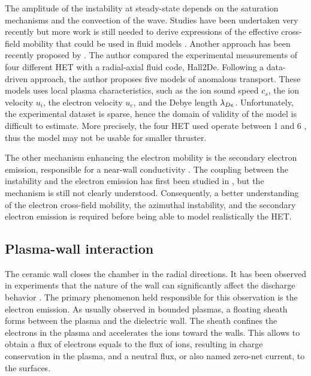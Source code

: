   The amplitude of the instability at steady-state depends on the saturation mechanisms and the convection of the wave.
  Studies have been  undertaken very recently but more work is still needed to derive expressions of the effective cross-field mobility that could be used in fluid models \citep{boeuf2017}.
  Another approach has been recently proposed by \citet{jorns2018}.
  The author compared the experimental measurements of four different \ac{HET} with a radial-axial fluid code, Hall2De.
  Following a data-driven approach, the author proposes five models of anomalous transport.
  These models uses local plasma characteristics, such as the ion sound speed $c_s$, the ion velocity $u_i$, the electron velocity $u_e$, and the Debye length $\lambda_{De}$.
  Unfortunately, the experimental dataset is sparse, hence the domain of validity of the model is difficult to estimate.
  More precisely, the four \ac{HET} used operate between 1 and 6 \kilo\watt, thus the model may not be usable for smaller thruster.
  
  The other mechanism enhancing the electron mobility is the secondary electron emission, responsible for a near-wall conductivity \citep{morozov1972,morozov2001, barral2003a}.
  The coupling between the instability and the electron emission has first been studied in \citet{heron2013}, but the mechanism is still not clearly understood.
  Consequently, a better understanding of the electron cross-field mobility, the azimuthal instability, and the secondary electron emission is required before being able to model realistically the \ac{HET}.
  
  
\subsection{Plasma-wall interaction}

  The ceramic wall closes the chamber in the radial directions.
  It has been observed in experiments that the nature of the wall can significantly affect the discharge behavior \citep{gascon2003}.
  The primary phenomenon held responsible for this observation is the electron emission.
  As usually observed in bounded plasmas, a floating sheath forms between the plasma and the dielectric wall.
  The sheath confines the electrons in the plasma and accelerates the ions toward the walls.
  This allows to obtain a flux of electrons equals to the flux of ions, resulting in charge conservation in the plasma, and a neutral flux, or also named zero-net current, to the surfaces.
  
